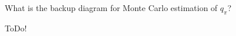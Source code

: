 
\begin{exercise}[Exercise 5.3]

What is the backup diagram for Monte Carlo estimation of $q_\pi$?

\end{exercise}


\begin{solution}

ToDo!

\end{solution}

